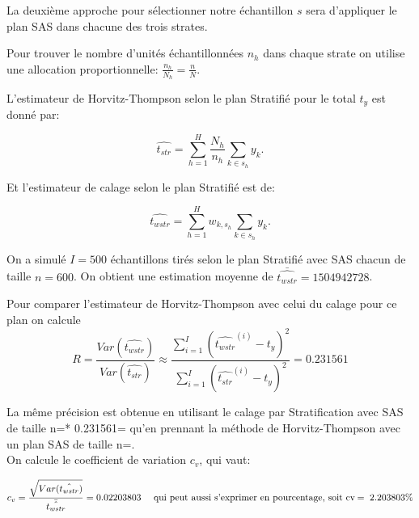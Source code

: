 \documentclass[11pt,fleqn]{book} %
\begin{document}
 
\vspace{1em}

 La deuxième approche pour sélectionner notre échantillon $s$ sera d'appliquer le plan SAS dans chacune des trois strates.
 
 
\vspace{1em}

 Pour trouver le nombre d'unités échantillonnées $n_h$ dans chaque strate on utilise une allocation proportionnelle: $\frac{n_h}{N_h}=\frac{n}{N}$.
 
 \vspace{1em}
 
L'estimateur de Horvitz-Thompson selon le plan Stratifié pour le total $t_y$ est donné par: 
  
  \begin{equation*}
 \hat{t_{str}}=\sum_{h=1}^H \frac{N_h}{n_h} \sum_{k\in s_h} y_k.
   \end{equation*}
   
 \vspace{1em}  

Et l'estimateur de calage selon le plan Stratifié est de:
  
  \begin{equation*}
  \hat{t_{wstr}}=\sum_{h=1}^H w_{k,s_h} \sum_{k\in s_h} y_k.
   \end{equation*}
   
  
\newpage
  
On a simulé $I=500$ échantillons tirés selon le plan Stratifié avec SAS chacun de taille $n=600$.
On obtient une estimation moyenne de $\bar{\hat{t_{wstr}}}=1504942728$.

\vspace{1em}

Pour comparer l'estimateur de Horvitz-Thompson avec celui du calage pour ce plan on calcule  \begin{equation*}
R=\frac{Var(\hat{t_{wstr}})}{Var(\hat{t_{str}})}\approx\frac{\sum_{i=1}^{I} (\hat{t_{wstr}}^{(i)}-t_y)^2}{\sum_{i=1}^{I} (\hat{t_{str}}^{(i)}-t_y)^2}= 0.231561
\end{equation*}  

La même précision est obtenue en utilisant le calage par Stratification avec SAS de taille n\:=* 0.231561\:= qu'en prennant la méthode de Horvitz-Thompson avec un plan SAS de taille n\:=.\\

On calcule le coefficient de variation $c_v$, qui vaut:

\begin{equation*}
 c_v=\frac{\sqrt{Var(\hat{t_{wstr}})}}{\bar{\hat{t_{wstr}}}} = 0.02203803 \quad \textnormal{ qui peut aussi s'exprimer en pourcentage, soit cv\:=\: 2.203803\%}
 \end{equation*}
 
\end{document}
